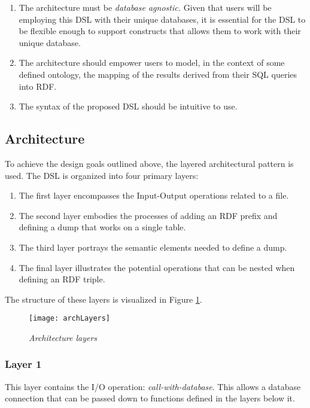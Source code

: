 \begin{enumerate}
\item The architecture must be \textit{database agnostic.}  Given that users will be employing this DSL with their unique databases, it is essential for the DSL to be flexible enough to support constructs that allows them to work with their unique database.
\item The architecture should empower users to model, in the context of some defined ontology, the mapping of the results derived from their SQL queries into RDF.
\item The syntax of the proposed DSL should be intuitive to use.
\end{enumerate}


\subsection{Architecture}

To achieve the design goals outlined above, the layered architectural pattern \citep{richards2015software} is used.  The DSL is organized into four primary layers:

\begin{enumerate}
\item The first layer encompasses the Input-Output operations related to a file.
\item The second layer embodies the processes of adding an RDF prefix and defining a dump that works on a single table.
\item The third layer portrays the semantic elements needed to define a dump.
\item The final layer illustrates the potential operations that can be nested when defining an RDF triple.
\end{enumerate}
    
The structure of these layers is visualized in Figure \ref{fig:layered-arch}.

\begin{figure}[H]
  \centering
  \texttt{[image: archLayers]}
  \caption{\textit{Architecture layers}}
  \label{fig:layered-arch}
  \centering
\end{figure}

\subsubsection{Layer 1}

This layer contains the I/O operation: \textit{call-with-database}.  This allows a database connection that can be passed down to functions defined in the layers below it.

